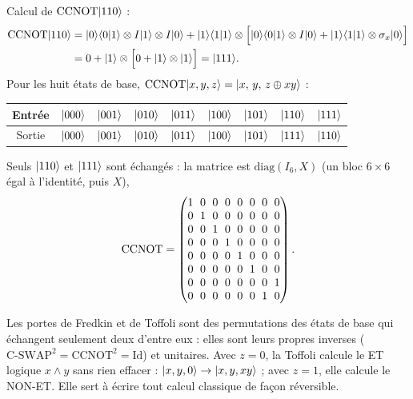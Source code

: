 Calcul de $\mathrm{CCNOT}|110\rangle$ :
\begin{align*}
  \mathrm{CCNOT}|110\rangle&=|0\rangle\langle 0|1\rangle\otimes I|1\rangle\otimes I|0\rangle
     +|1\rangle\langle 1|1\rangle\otimes\Big[|0\rangle\langle 0|1\rangle\otimes I|0\rangle
       +|1\rangle\langle 1|1\rangle\otimes\sigma_x|0\rangle\Big]\\
  &=0+|1\rangle\otimes\Big[0+|1\rangle\otimes|1\rangle\Big]=|111\rangle.
\end{align*}
Pour les huit états de base, $\mathrm{CCNOT}|x,y,z\rangle=|x,\,y,\,z\oplus xy\rangle$ :
\begin{center}
\renewcommand{\arraystretch}{1.3}
\begin{tabular}{@{}ccccccccc@{}}
\toprule
Entrée & $|000\rangle$ & $|001\rangle$ & $|010\rangle$ & $|011\rangle$ & $|100\rangle$ & $|101\rangle$ & $|110\rangle$ & $|111\rangle$ \\
\midrule
Sortie & $|000\rangle$ & $|001\rangle$ & $|010\rangle$ & $|011\rangle$ & $|100\rangle$ & $|101\rangle$ & $|111\rangle$ & $|110\rangle$ \\
\bottomrule
\end{tabular}
\end{center}
Seuls $|110\rangle$ et $|111\rangle$ sont échangés : la matrice est $\mathrm{diag}(I_6,X)$
(un bloc $6\times6$ égal à l'identité, puis $X$),
\[
  \mathrm{CCNOT}=\begingroup\setlength{\arraycolsep}{3pt}\begin{pmatrix}
    1&0&0&0&0&0&0&0\\
    0&1&0&0&0&0&0&0\\
    0&0&1&0&0&0&0&0\\
    0&0&0&1&0&0&0&0\\
    0&0&0&0&1&0&0&0\\
    0&0&0&0&0&1&0&0\\
    0&0&0&0&0&0&0&1\\
    0&0&0&0&0&0&1&0
  \end{pmatrix}\endgroup .
\]

\begin{remarque}
Les portes de Fredkin et de Toffoli sont des permutations des états de base qui échangent
seulement deux d'entre eux : elles sont leurs propres inverses ($\mathrm{C\text{-}SWAP}^2=\mathrm{CCNOT}^2=\mathrm{Id}$)
et unitaires. Avec $z=0$, la Toffoli calcule le ET logique $x\wedge y$ sans rien effacer :
$|x,y,0\rangle\to|x,y,xy\rangle$ ; avec $z=1$, elle calcule le NON-ET. Elle sert à écrire tout calcul
classique de façon réversible.
\end{remarque}

\clearpage
